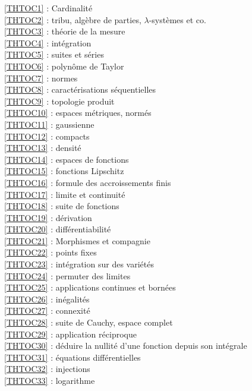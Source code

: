 \ref {THTOC1} : Cardinalité\\
\ref {THTOC2} : tribu, algèbre de parties, \( \lambda \)-systèmes et co.\\
\ref {THTOC3} : théorie de la mesure\\
\ref {THTOC4} : intégration\\
\ref {THTOC5} : suites et séries\\
\ref {THTOC6} : polynôme de Taylor\\
\ref {THTOC7} : normes\\
\ref {THTOC8} : caractérisations séquentielles\\
\ref {THTOC9} : topologie produit\\
\ref {THTOC10} : espaces métriques, normés\\
\ref {THTOC11} : gaussienne\\
\ref {THTOC12} : compacts\\
\ref {THTOC13} : densité\\
\ref {THTOC14} : espaces de fonctions\\
\ref {THTOC15} : fonctions Lipschitz\\
\ref {THTOC16} : formule des accroissements finis\\
\ref {THTOC17} : limite et continuité\\
\ref {THTOC18} : suite de fonctions\\
\ref {THTOC19} : dérivation\\
\ref {THTOC20} : différentiabilité\\
\ref {THTOC21} : Morphismes et compagnie\\
\ref {THTOC22} : points fixes\\
\ref {THTOC23} : intégration sur des variétés\\
\ref {THTOC24} : permuter des limites\\
\ref {THTOC25} : applications continues et bornées\\
\ref {THTOC26} : inégalités\\
\ref {THTOC27} : connexité\\
\ref {THTOC28} : suite de Cauchy, espace complet\\
\ref {THTOC29} : application réciproque\\
\ref {THTOC30} : déduire la nullité d'une fonction depuis son intégrale\\
\ref {THTOC31} : équations différentielles\\
\ref {THTOC32} : injections\\
\ref {THTOC33} : logarithme\\
